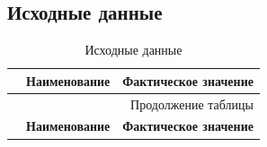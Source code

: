 \subsection{Исходные данные}\label{sec:safety:data}
\small
\singlespacing
\begin{longtable}[h]{|p{}|p{}|p{}|}
  \caption{Исходные данные}\label{safety:data}
  \\ \hline
	  \textbf{\No}                  &
	  \textbf{Наименование}         &
	  \textbf{Фактическое значение}
	\\ \hline
  \endfirsthead

  \multicolumn{3}{r}{Продолжение таблицы \thetable{}}
  \\ \hline
	  \textbf{\No}                  &
	  \textbf{Наименование}         &
	  \textbf{Фактическое значение}
	\\ \hline
  \endhead


\end{longtable}
